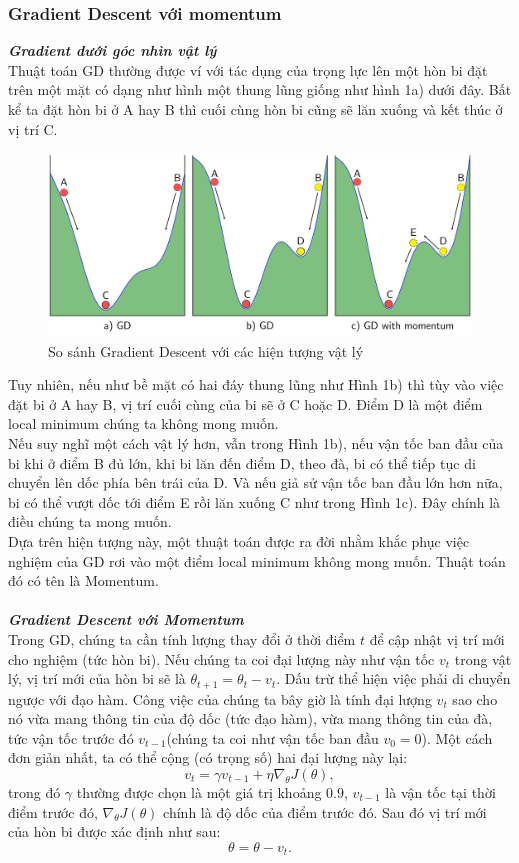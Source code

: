 \documentclass[]{article}
\begin{document}
\subsubsection{Gradient Descent với momentum}
\textit{\textbf{Gradient dưới góc nhìn vật lý}}
\\
Thuật toán GD thường được ví với tác dụng của trọng lực lên một hòn bi đặt trên một mặt có dạng như hình một thung lũng giống như hình 1a) dưới đây. Bất kể ta đặt hòn bi ở A hay B thì cuối cùng hòn bi cũng sẽ lăn xuống và kết thúc ở vị trí C.
\begin{figure}[h!]
	\centering
	\includegraphics[width=0.9\linewidth]{momentum}
	\caption{So sánh Gradient Descent với các hiện tượng vật lý}
\end{figure}

\noindent Tuy nhiên, nếu như bề mặt có hai đáy thung lũng như Hình 1b) thì tùy vào việc đặt bi ở A hay B, vị trí cuối cùng của bi sẽ ở C hoặc D. Điểm D là một điểm local minimum chúng ta không mong muốn.
\\
Nếu suy nghĩ một cách vật lý hơn, vẫn trong Hình 1b), nếu vận tốc ban đầu của bi khi ở điểm B đủ lớn, khi bi lăn đến điểm D, theo đà, bi có thể tiếp tục di chuyển lên dốc phía bên trái của D. Và nếu giả sử vận tốc ban đầu lớn hơn nữa, bi có thể vượt dốc tới điểm E rồi lăn xuống C như trong Hình 1c). Đây chính là điều chúng ta mong muốn. 
\\
Dựa trên hiện tượng này, một thuật toán được ra đời nhằm khắc phục việc nghiệm của GD rơi vào một điểm local minimum không mong muốn. Thuật toán đó có tên là Momentum.
\\\\
\textit{\textbf{Gradient Descent với Momentum}}
\\
Trong GD, chúng ta cần tính lượng thay đổi ở thời điểm $t$ để cập nhật vị trí mới cho nghiệm (tức hòn bi). Nếu chúng ta coi đại lượng này như vận tốc $v_t$ trong vật lý, vị trí mới của hòn bi sẽ là $\theta_{t+1} = \theta_{t} - v_t$. Dấu trừ thể hiện việc phải di chuyển ngược với đạo hàm. Công việc của chúng ta bây giờ là tính đại lượng $v_t$ sao cho nó vừa mang thông tin của độ dốc (tức đạo hàm), vừa mang thông tin của đà, tức vận tốc trước đó $v_{t-1}$(chúng ta coi như vận tốc ban đầu $v_0=0$). Một cách đơn giản nhất, ta có thể cộng (có trọng số) hai đại lượng này lại:
$$v_{t}= \gamma v_{t-1} + \eta \nabla_{\theta}J(\theta),$$
trong đó $\gamma$ thường được chọn là một giá trị khoảng $0.9$, $v_{t-1}$
là vận tốc tại thời điểm trước đó, $\nabla_\theta J(\theta)$ chính là độ dốc của điểm trước đó. Sau đó vị trí mới của hòn bi được xác định như sau:
$$\theta = \theta - v_t.$$
\end{document}
